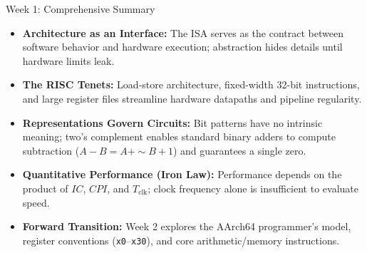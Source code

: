 \documentclass[aspectratio=169,11pt]{beamer}
\newcommand{\key}[1]{\textbf{#1}}
\newcommand{\bits}[1]{\texttt{#1}}
\begin{document}

\begin{frame}{Week 1: Comprehensive Summary}

\begin{itemize}\setlength{\itemsep}{7pt}
  \item \key{Architecture as an Interface:} The ISA serves as the contract between software behavior and hardware execution; abstraction hides details until hardware limits leak.
  \item \key{The RISC Tenets:} Load-store architecture, fixed-width 32-bit instructions, and large register files streamline hardware datapaths and pipeline regularity.
  \item \key{Representations Govern Circuits:} Bit patterns have no intrinsic meaning; two's complement enables standard binary adders to compute subtraction ($A - B = A + \sim B + 1$) and guarantees a single zero.
  \item \key{Quantitative Performance (Iron Law):} Performance depends on the product of $\mathit{IC}$, $\mathit{CPI}$, and $T_{\text{clk}}$; clock frequency alone is insufficient to evaluate speed.
  \item \key{Forward Transition:} Week 2 explores the AArch64 programmer's model, register conventions (\bits{x0}--\bits{x30}), and core arithmetic/memory instructions.
\end{itemize}

\end{frame}

\end{document}
